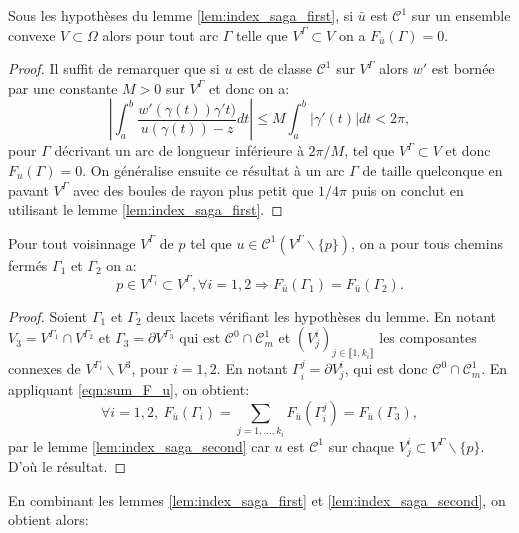 \begin{lemma}
    \label{lem:index_saga_second}
    Sous les hypothèses du lemme \ref{lem:index_saga_first}, si $\bar{u}$ est $\mathcal{C}^1$ sur un ensemble convexe $V\subset\Omega$ alors pour tout arc $\Gamma$
    telle que $V^\Gamma\subset V$ on a $F_{\bar{u}}(\Gamma)=0$.
\end{lemma}

\begin{proof}
    Il suffit de remarquer que si $u$ est de classe $\mathcal{C}^1$ sur $V^\Gamma$ alors $w'$ est bornée par une constante $M>0$ sur $V^\Gamma$ et donc on a:
    $$
    \left|\int_a^b\frac{w'(\gamma(t))\gamma't)}{u(\gamma(t))-z}dt\right|\leq M\int_a^b|\gamma'(t)|dt<2\pi,
    $$
    pour $\Gamma$ décrivant un arc de longueur inférieure à $2\pi/M$, tel que $V^\Gamma\subset V$ et donc $F_u(\Gamma)=0$. On généralise ensuite ce résultat à un arc $\Gamma$ de taille quelconque en pavant $V^\Gamma$ avec des boules de rayon plus petit que $1/4\pi$ puis on conclut en utilisant le lemme \ref{lem:index_saga_first}.
\end{proof}

\begin{lemma}
    \label{lem:index_saga_third}
    Pour tout voisinnage $V^\Gamma$ de $p$ tel que $u\in\mathcal{C}^1(V^\Gamma\backslash\{p\})$, on a pour tous chemins fermés $\Gamma_1$ et $\Gamma_2$ on a:
    $$
    p\in V^{\Gamma_i}\subset V^\Gamma, \forall i=1, 2\Longrightarrow F_{\bar{u}}(\Gamma_1)=F_{\bar{u}}(\Gamma_2).
    $$
\end{lemma}

\begin{proof}
    Soient $\Gamma_1$ et $\Gamma_2$ deux lacets vérifiant les hypothèses du lemme. En notant $V_3=V^{\Gamma_1}\cap V^{\Gamma_2}$ et $\Gamma_3=\partial V^{\Gamma_3}$ qui est $\mathcal{C}^0\cap\mathcal{C}^1_m$ et $(V^i_j)_{j\in\llbracket 1, k_i\rrbracket}$ les composantes connexes de $V^{\Gamma_i}\backslash V^3$, pour $i=1,2$. En notant $\Gamma_i^j=\partial V^i_j$, qui est donc $\mathcal{C}^0\cap\mathcal{C}^1_m$. En appliquant \eqref{eqn:sum_F_u}, on obtient:
    $$
    \forall i=1,2,~F_{\bar{u}}(\Gamma_i)=\sum_{j=1,\dots,k_i}F_{\bar{u}}(\Gamma_i^j)=F_{\bar{u}}(\Gamma_3),
    $$
    par le lemme \ref{lem:index_saga_second} car $u$ est $\mathcal{C}^1$ sur chaque $V^i_j\subset V^\Gamma\backslash\{p\}$. D'où le résultat.
\end{proof}

En combinant les lemmes \ref{lem:index_saga_first} et \ref{lem:index_saga_second}, on obtient alors:

